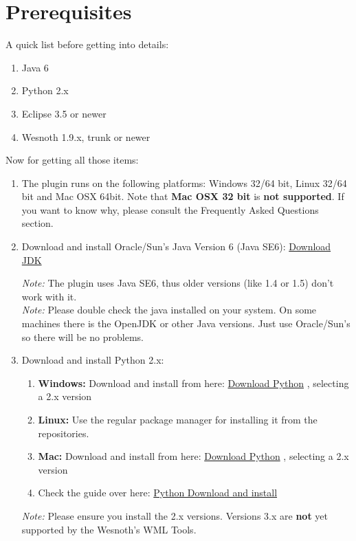 \documentclass[10pt]{article}
\begin{document}
\section{Prerequisites}
A quick list before getting into details:
\begin{enumerate}
\item Java 6
\item Python 2.x
\item Eclipse 3.5 or newer
\item Wesnoth 1.9.x, trunk or newer
\end{enumerate}

Now for getting all those items:
\begin{enumerate}
\item The plugin runs on the following platforms: Windows 32/64 bit, Linux 32/64 bit and Mac OSX 64bit. Note that \textbf{Mac OSX 32 bit} is \textbf{not supported}. If you want to know why, please consult the Frequently Asked Questions section.
\item Download and install Oracle/Sun's Java Version 6 (Java SE6): \href{http://java.sun.com/javase/downloads/widget/jdk6.jsp}{Download JDK}

\textit{Note:} The plugin uses Java SE6, thus older versions (like 1.4 or 1.5) don't work with it.\\
\textit{Note:} Please double check the java installed on your system. On some machines there is the OpenJDK or other Java versions. Just use Oracle/Sun's so there will be no problems.

\item Download and install Python 2.x:
 \begin{enumerate}
   \item \textbf{Windows:} Download and install from here: \href{http://python.org/download/}{Download Python} , selecting a 2.x version
   \item \textbf{Linux:} Use the regular package manager for installing it from the repositories.
   \item \textbf{Mac:} Download and install from here: \href{http://python.org/download/}{Download Python} , selecting a 2.x version
   \item Check the guide over here: \href{http://wiki.python.org/moin/BeginnersGuide/Download}{Python Download and install} 
  \end{enumerate}
 \textit{Note:} Please ensure you install the 2.x versions. Versions 3.x are \textbf{not} yet supported by the Wesnoth's WML Tools.


\end{enumerate}
\end{document}
